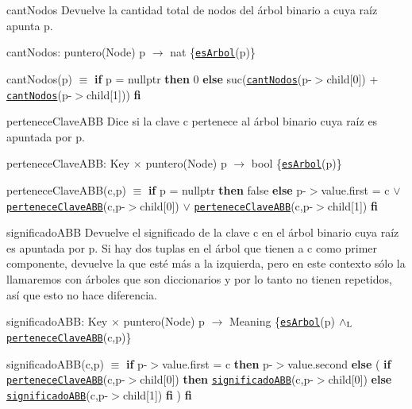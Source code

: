 \begin{DoxyParagraph}{cant\-Nodos}
Devuelve la cantidad total de nodos del árbol binario a cuya raíz apunta p.

cant\-Nodos\-: puntero(\-Node) p $\to$ nat \{\href{axiomas.html#esArbol}{\tt es\-Arbol}(p)\} \par
 cant\-Nodos(p) $\equiv$ {\bfseries if} p = nullptr {\bfseries then} 0 {\bfseries else} suc(\href{axiomas.html#cantNodos}{\tt cant\-Nodos}(p-\/$>$child\mbox{[}0\mbox{]}) + \href{axiomas.html#cantNodos}{\tt cant\-Nodos}(p-\/$>$child\mbox{[}1\mbox{]})) {\bfseries fi} 


\end{DoxyParagraph}
\begin{DoxyParagraph}{pertenece\-Clave\-A\-B\-B}
Dice si la clave c pertenece al árbol binario cuya raíz es apuntada por p.

pertenece\-Clave\-A\-B\-B\-: Key $\times$ puntero(\-Node) p $\to$ bool \{\href{axiomas.html#esArbol}{\tt es\-Arbol}(p)\} \par
 pertenece\-Clave\-A\-B\-B(c,p) $\equiv$ {\bfseries if} p = nullptr {\bfseries then} false {\bfseries else} p-\/$>$value.\-first = c $\lor$ \href{axiomas.html#perteneceClaveABB}{\tt pertenece\-Clave\-A\-B\-B}(c,p-\/$>$child\mbox{[}0\mbox{]}) $\lor$ \href{axiomas.html#perteneceClaveABB}{\tt pertenece\-Clave\-A\-B\-B}(c,p-\/$>$child\mbox{[}1\mbox{]}) {\bfseries fi} 


\end{DoxyParagraph}
\begin{DoxyParagraph}{significado\-A\-B\-B}
Devuelve el significado de la clave c en el árbol binario cuya raíz es apuntada por p. Si hay dos tuplas en el árbol que tienen a c como primer componente, devuelve la que esté más a la izquierda, pero en este contexto sólo la llamaremos con árboles que son diccionarios y por lo tanto no tienen repetidos, así que esto no hace diferencia.

significado\-A\-B\-B\-: Key $\times$ puntero(\-Node) p $\to$ Meaning \{\href{axiomas.html#esArbol}{\tt es\-Arbol}(p) $\land_{\rm L}$ \href{axiomas.html#perteneceClaveABB}{\tt pertenece\-Clave\-A\-B\-B}(c,p)\} \par
 significado\-A\-B\-B(c,p) $\equiv$ {\bfseries if} p-\/$>$value.\-first = c {\bfseries then} p-\/$>$value.\-second {\bfseries else} ( {\bfseries if} \href{axiomas.html#perteneceClaveABB}{\tt pertenece\-Clave\-A\-B\-B}(c,p-\/$>$child\mbox{[}0\mbox{]}) {\bfseries then} \href{axiomas.html#significadoABB}{\tt significado\-A\-B\-B}(c,p-\/$>$child\mbox{[}0\mbox{]}) {\bfseries else} \href{axiomas.html#significadoABB}{\tt significado\-A\-B\-B}(c,p-\/$>$child\mbox{[}1\mbox{]}) {\bfseries fi} ) {\bfseries fi} 


\end{DoxyParagraph}

